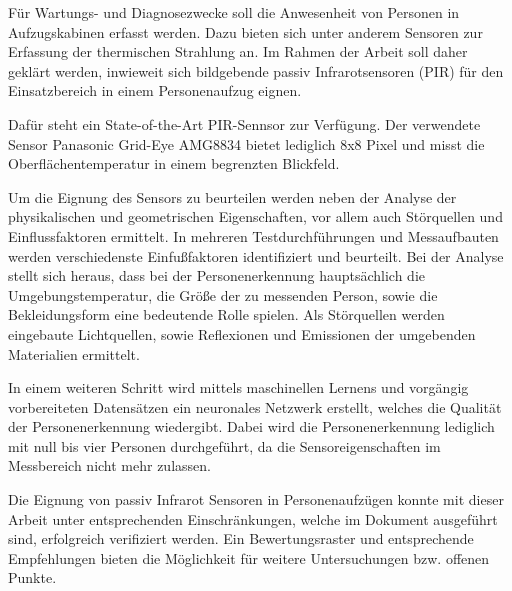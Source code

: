 Für Wartungs- und Diagnosezwecke soll die Anwesenheit von Personen in Aufzugskabinen erfasst werden. Dazu bieten sich unter anderem Sensoren zur Erfassung der thermischen Strahlung an. Im Rahmen der Arbeit soll daher geklärt werden, inwieweit sich bildgebende passiv Infrarotsensoren (PIR) für den Einsatzbereich in einem Personenaufzug eignen. 

Dafür steht ein State-of-the-Art PIR-Sennsor zur Verfügung. Der verwendete Sensor Panasonic Grid-Eye AMG8834 bietet lediglich 8x8 Pixel und misst die Oberflächentemperatur in einem begrenzten Blickfeld.  

Um die Eignung des Sensors zu beurteilen werden neben der Analyse der physikalischen und geometrischen Eigenschaften, vor allem auch Störquellen und Einflussfaktoren ermittelt. In mehreren Testdurchführungen und Messaufbauten werden verschiedenste Einfußfaktoren identifiziert und beurteilt. Bei der Analyse stellt sich heraus, dass bei der Personenerkennung hauptsächlich die Umgebungstemperatur, die Größe der zu messenden Person, sowie die Bekleidungsform eine bedeutende Rolle spielen. Als Störquellen werden eingebaute Lichtquellen, sowie Reflexionen und Emissionen der umgebenden Materialien ermittelt.  

In einem weiteren Schritt wird mittels maschinellen Lernens und vorgängig vorbereiteten Datensätzen ein neuronales Netzwerk erstellt, welches die Qualität der Personenerkennung wiedergibt. Dabei wird die Personenerkennung lediglich mit null bis vier Personen durchgeführt, da die Sensoreigenschaften im Messbereich nicht mehr zulassen. 

Die Eignung von passiv Infrarot Sensoren in Personenaufzügen konnte mit dieser Arbeit unter entsprechenden Einschränkungen, welche im Dokument ausgeführt sind, erfolgreich verifiziert werden.
Ein Bewertungsraster und entsprechende Empfehlungen bieten die Möglichkeit für weitere Untersuchungen bzw. offenen Punkte.   



